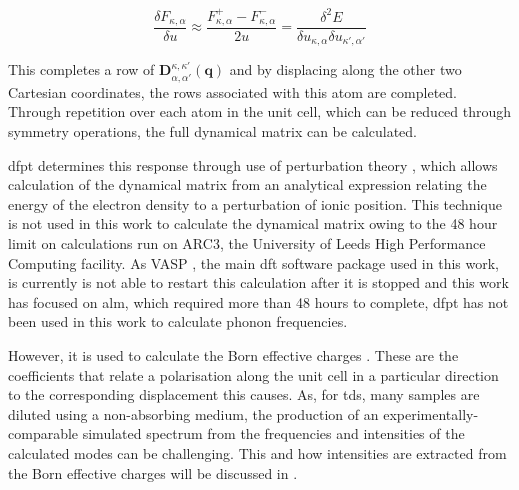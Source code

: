 \begin{equation}
\frac{\delta F_{\kappa, \alpha}}{\delta u} \approx \frac{F_{\kappa, \alpha}^+ - F_{\kappa, \alpha}^-}{2u} = \frac{\delta^2 E}{\delta u_{\kappa, \alpha} \delta u_{\kappa', \alpha'}}
\end{equation}

This completes a row of \(\boldsymbol{D}_{\alpha, \alpha'}^{\kappa, \kappa'} (\boldsymbol{q})\) and by displacing along the other two Cartesian coordinates, the rows associated with this atom are completed. Through repetition over each atom in the unit cell, which can be reduced through symmetry operations, the full dynamical matrix can be calculated. 

\acrshort{dfpt} determines this response through use of perturbation theory \DIFdelbegin \DIFdel{~}\DIFdelend \cite{Baroni2001}, which allows calculation of the dynamical matrix from an analytical expression relating the energy of the electron density to a perturbation of ionic position. This technique is not used in this work to calculate the dynamical matrix owing to the 48 hour limit on calculations run on ARC3, the University of Leeds High Performance Computing facility. As VASP \DIFdelbegin \DIFdel{~}\DIFdelend \cite{Hafner2008}, the main \acrshort{dft} software package used in this work, is currently is not able to restart this calculation after it is stopped and this work has focused on \acrshort{alm}, which required more than 48 hours to complete, \acrshort{dfpt} has not been used in this work to calculate phonon frequencies. 

However, it is used to calculate the Born effective charges \DIFdelbegin \DIFdel{~}\DIFdelend \cite{Gonze1997}. These are the coefficients that relate a polarisation along the unit cell in a particular direction to the corresponding displacement this causes. As, for \acrshort{tds}, many samples are diluted using a non\nobreakdash-absorbing medium, the production of an experimentally\nobreakdash-comparable simulated spectrum from the frequencies and intensities of the calculated modes can be challenging. This and how intensities are extracted from the Born effective charges will be discussed in .

